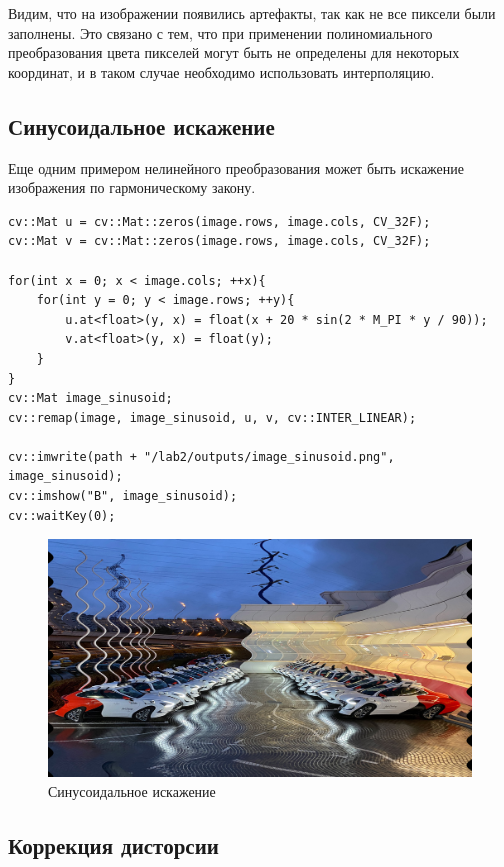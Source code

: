 Видим, что на изображении появились артефакты, так как не все пиксели были заполнены. Это связано с тем, что при применении полиномиального преобразования
цвета пикселей могут быть не определены для некоторых координат, и в таком случае необходимо использовать интерполяцию.

\pagebreak
\subsection{Синусоидальное искажение}

Еще одним примером нелинейного преобразования может быть искажение изображения по гармоническому закону.

\begin{lstlisting}[style=cpp_white, caption={Исходный код для синусоидального искажения}]
cv::Mat u = cv::Mat::zeros(image.rows, image.cols, CV_32F);
cv::Mat v = cv::Mat::zeros(image.rows, image.cols, CV_32F);

for(int x = 0; x < image.cols; ++x){
    for(int y = 0; y < image.rows; ++y){
        u.at<float>(y, x) = float(x + 20 * sin(2 * M_PI * y / 90));
        v.at<float>(y, x) = float(y);
    }
}
cv::Mat image_sinusoid;
cv::remap(image, image_sinusoid, u, v, cv::INTER_LINEAR);

cv::imwrite(path + "/lab2/outputs/image_sinusoid.png", image_sinusoid);
cv::imshow("B", image_sinusoid);
cv::waitKey(0);
\end{lstlisting}

\begin{figure}[ht]
    \includegraphics[width=\textwidth]{../outputs/image_sinusoid.png}
    \caption{Синусоидальное искажение}
    \label{fig:sinusoidal_image}
\end{figure}

\pagebreak
\subsection{Коррекция дисторсии}

